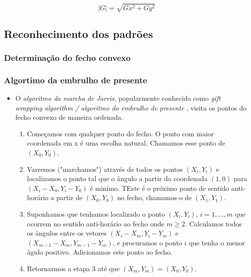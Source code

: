 \documentclass{sciposter}
\begin{document}
\begin{multicols}{3}
$$
|G|=\sqrt{Gx^2 + Gy^2}
$$	

\subsection*{Reconhecimento dos padrões}
\subsubsection*{Determinação do fecho convexo}


\bigskip
\subsubsection*{Algortimo da embrulho de presente}

\begin{itemize}

\item O {\em algoritmo da marcha de Jarvis}, popularmente conhecido como {\em gift
wrapping algorithm / algoritmo do embrulho de presente} , visita os pontos do fecho convexo de maneira ordenada.

\begin{enumerate}

\item Começamos com qualquer ponto do fecho. O ponto com maior coordenada em x é uma escolha natural. Chamamos esse ponto de $(X_0, Y_0)$.

\item Varremos ("marchamos") através de todos os pontos $(X_i, Y_i)$ e localizamos o ponto tal que o ângulo a partir da coordenada $(1,0)$ para $(X_i - X_0, Y_i - Y_0)$ é minímo.
TEste é o próximo ponto de sentido anti-horário a partir de $(X_0,Y_0)$ no fecho, chamamos-o de $(X_1, Y_1)$.

\item Suponhamos que tenhamos localizado o ponto $(X_i,Y_i)$, $i=1, \ldots, m$ que ocorrem no sentido anti-horário ao fecho onde $m \ge 2$.
Calculamos todos os ângulos entre os vetores $(X_i - X_m, Y_i - Y_m)$ e
$(X_{m-1} - X_m, Y_{m-1} - Y_m)$, e procuramos o ponto $i$ que tenha o menor âgulo positivo.  Adicionamos este ponto ao fecho.

\item Retornarmos a etapa 3 até que $(X_m,Y_m) = (X_0,Y_0)$.

\end{enumerate}


\end{itemize}
\end{multicols}
\end{document}
